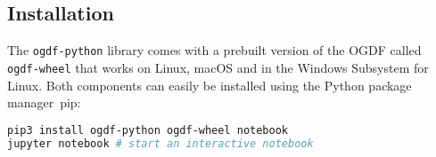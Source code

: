 \documentclass{llncs}
\begin{document}
\subsection*{Installation}
The \texttt{ogdf-python} library comes with a prebuilt version of the OGDF called \texttt{ogdf-wheel} that works on Linux, macOS and in the Windows Subsystem for Linux.
Both components can easily be installed using the Python package manager~pip:

\begin{lstlisting}[language=bash]
pip3 install ogdf-python ogdf-wheel notebook
jupyter notebook # start an interactive notebook
\end{lstlisting}




\end{document}
